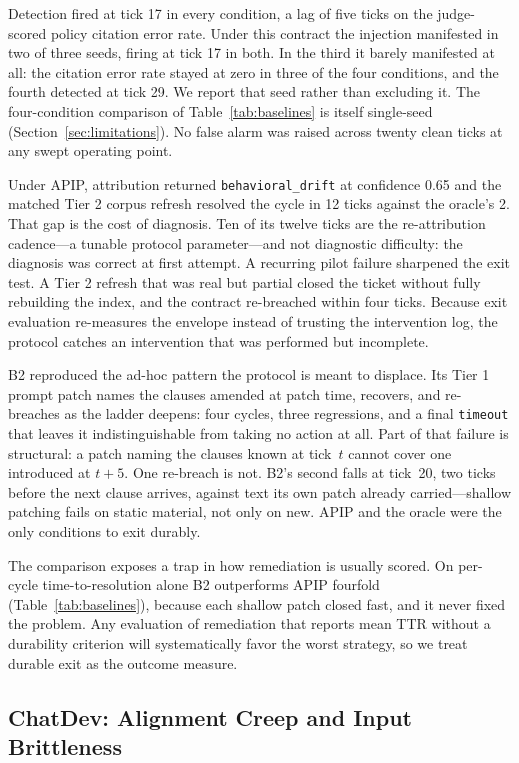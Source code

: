 \documentclass[conference]{IEEEtran}
\newcommand{\code}[1]{\texttt{\small #1}}
\begin{document}
Detection fired at tick 17 in every condition, a lag of five ticks on the
judge-scored policy citation error rate. Under this contract the injection
manifested in two of three seeds, firing at tick 17 in both. In the third it
barely manifested at all: the citation error rate stayed at zero in three of the
four conditions, and the fourth detected at tick 29. We report that seed rather
than excluding it. The four-condition comparison of
Table~\ref{tab:baselines} is itself single-seed
(Section~\ref{sec:limitations}). No false alarm was raised across
twenty clean ticks at any swept operating point.

Under APIP, attribution returned \code{behavioral\_drift} at confidence 0.65
and the matched Tier 2 corpus refresh resolved the cycle in 12 ticks against
the oracle's 2. That gap is the cost of diagnosis. Ten of its twelve ticks are
the re-attribution cadence---a tunable protocol parameter---and not diagnostic
difficulty: the diagnosis was correct at first attempt. A recurring pilot
failure sharpened the exit test. A Tier 2 refresh that was real but partial
closed the ticket without fully rebuilding the index, and the contract
re-breached within four ticks. Because exit evaluation re-measures the envelope
instead of trusting the intervention log, the protocol catches an intervention
that was performed but incomplete.

B2 reproduced the ad-hoc pattern the protocol is meant to displace. Its Tier 1
prompt patch names the clauses amended at patch time, recovers, and re-breaches
as the ladder deepens: four cycles, three regressions, and a final
\code{timeout} that leaves it indistinguishable from taking no action at all.
Part of that failure is structural: a patch naming the clauses known at
tick~$t$ cannot cover one introduced at $t{+}5$. One re-breach is not. B2's
second falls at tick~20, two ticks before the next clause arrives, against text
its own patch already carried---shallow patching fails on static material, not
only on new. APIP and the oracle were the only conditions to exit durably.

The comparison exposes a trap in how remediation is usually scored. On
per-cycle time-to-resolution alone B2 outperforms APIP fourfold
(Table~\ref{tab:baselines}), because each shallow patch closed fast, and it
never fixed the problem. Any evaluation of remediation that reports mean TTR
without a durability criterion will systematically favor the worst strategy, so
we treat durable exit as the outcome measure.

\subsection{ChatDev: Alignment Creep and Input Brittleness}
\label{sec:chatdev}
\end{document}
